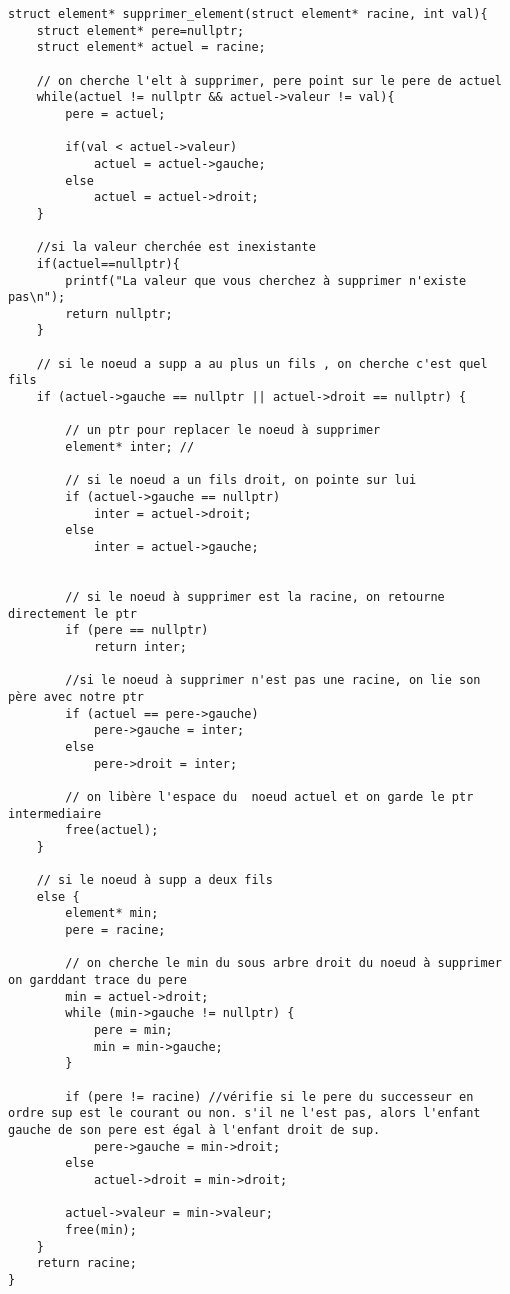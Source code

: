 \begin{verbatim}
struct element* supprimer_element(struct element* racine, int val){
    struct element* pere=nullptr;
    struct element* actuel = racine;

    // on cherche l'elt à supprimer, pere point sur le pere de actuel
    while(actuel != nullptr && actuel->valeur != val){
        pere = actuel;

        if(val < actuel->valeur)
            actuel = actuel->gauche;
        else
            actuel = actuel->droit;
    } 

    //si la valeur cherchée est inexistante
    if(actuel==nullptr){
        printf("La valeur que vous cherchez à supprimer n'existe pas\n");
        return nullptr;
    }
    
    // si le noeud a supp a au plus un fils , on cherche c'est quel fils
    if (actuel->gauche == nullptr || actuel->droit == nullptr) {
 
        // un ptr pour replacer le noeud à supprimer
        element* inter; //
 
        // si le noeud a un fils droit, on pointe sur lui 
        if (actuel->gauche == nullptr)
            inter = actuel->droit;
        else
            inter = actuel->gauche;
 
        
        // si le noeud à supprimer est la racine, on retourne directement le ptr
        if (pere == nullptr)
            return inter;
 
        //si le noeud à supprimer n'est pas une racine, on lie son père avec notre ptr
        if (actuel == pere->gauche)
            pere->gauche = inter;
        else
            pere->droit = inter;
 
        // on libère l'espace du  noeud actuel et on garde le ptr intermediaire 
        free(actuel);
    }
 
    // si le noeud à supp a deux fils
    else {
        element* min;
        pere = racine;
 
        // on cherche le min du sous arbre droit du noeud à supprimer on garddant trace du pere 
        min = actuel->droit;
        while (min->gauche != nullptr) {
            pere = min;
            min = min->gauche;
        }
 
        if (pere != racine) //vérifie si le pere du successeur en ordre sup est le courant ou non. s'il ne l'est pas, alors l'enfant gauche de son pere est égal à l'enfant droit de sup.
            pere->gauche = min->droit;
        else
            actuel->droit = min->droit;
 
        actuel->valeur = min->valeur;
        free(min);
    }
    return racine;
}



\end{verbatim}

